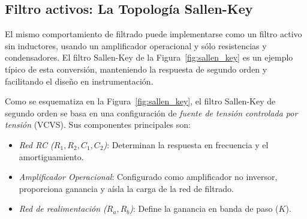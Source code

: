 
\subsection{Filtro activos: La Topología Sallen-Key}\label{sec:sallen_key}

El mismo comportamiento de filtrado puede implementarse como un filtro activo sin inductores, usando un amplificador operacional y sólo resistencias y condensadores. El filtro Sallen-Key de la Figura~\ref{fig:sallen_key} es un ejemplo típico de esta conversión, manteniendo la respuesta de segundo orden y facilitando el diseño en instrumentación.

Como se esquematiza en la Figura~\ref{fig:sallen_key}, el filtro Sallen-Key de segundo orden se basa en una configuración de \emph{fuente de tensión controlada por tensión} (VCVS). Sus componentes principales son:
\begin{itemize}
    \item \emph{Red RC ($R_1, R_2, C_1, C_2$)}: Determinan la respuesta en frecuencia y el amortiguamiento.
    \item \emph{Amplificador Operacional}: Configurado como amplificador no inversor, proporciona ganancia y aísla la carga de la red de filtrado.
    \item \emph{Red de realimentación ($R_a, R_b$)}: Define la ganancia en banda de paso ($K$).
\end{itemize}

